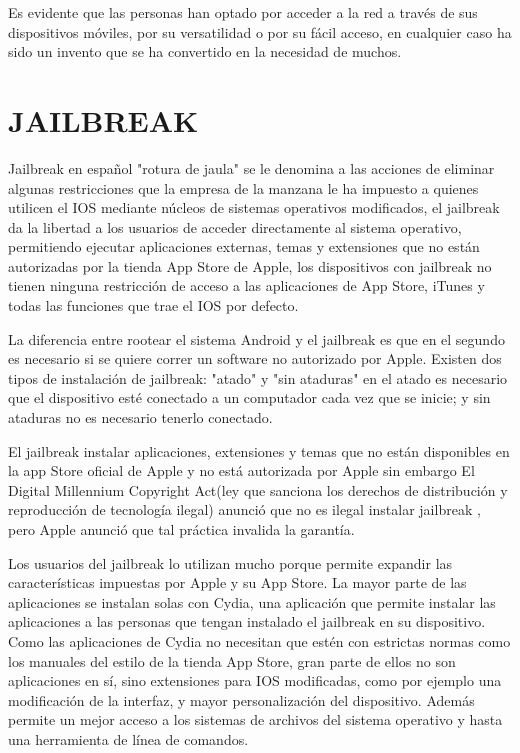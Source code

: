 Es evidente que las personas han optado por acceder a la red a
través de sus dispositivos móviles, por su versatilidad o por su
fácil acceso, en cualquier caso ha sido un invento que se ha
convertido en la necesidad de muchos.

\section*{JAILBREAK}

Jailbreak en español "rotura de jaula" se le denomina a las
acciones de eliminar algunas restricciones que la empresa de la
manzana le ha impuesto a quienes utilicen el IOS mediante
núcleos de sistemas operativos modificados, el jailbreak da la
libertad a los usuarios de acceder directamente al sistema
operativo, permitiendo ejecutar aplicaciones externas, temas y
extensiones que no están autorizadas por la tienda App Store de
Apple, los dispositivos con jailbreak no tienen ninguna
restricción de acceso a las aplicaciones de App Store, iTunes y
todas las funciones que trae el IOS por defecto.

La diferencia entre rootear el sistema Android y el jailbreak es
que en el segundo es necesario si se quiere correr un software
no autorizado por Apple. Existen dos tipos de instalación de
jailbreak: "atado" y "sin ataduras" en el atado es necesario que
el dispositivo esté conectado a un computador cada vez que se
inicie; y sin ataduras no es necesario tenerlo conectado.

El jailbreak instalar aplicaciones, extensiones y temas que no
están disponibles en la app Store oficial de Apple y no está
autorizada por Apple sin embargo El Digital Millennium
Copyright Act(ley que sanciona los derechos de distribución y
reproducción de tecnología ilegal) anunció que no es ilegal
instalar jailbreak , pero Apple anunció que tal práctica invalida
la garantía.

Los usuarios del jailbreak lo utilizan mucho porque permite
expandir las características impuestas por Apple y su App Store.
La mayor parte de las aplicaciones se instalan solas con Cydia,
una aplicación que permite instalar las aplicaciones a las
personas que tengan instalado el jailbreak en su dispositivo.
Como las aplicaciones de Cydia no necesitan que estén con
estrictas normas como los manuales del estilo de la tienda App
Store, gran parte de ellos no son aplicaciones en sí, sino
extensiones para IOS modificadas, como por ejemplo una
modificación de la interfaz, y mayor personalización del
dispositivo. Además permite un mejor acceso a los sistemas de
archivos del sistema operativo y hasta una herramienta de línea
de comandos.

